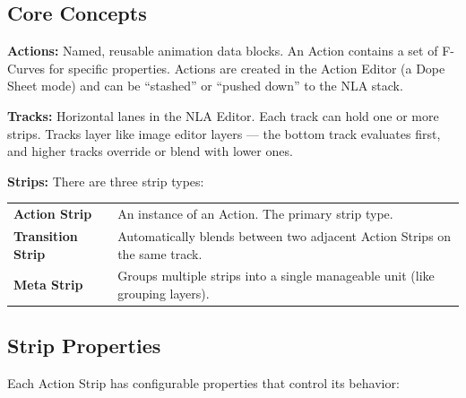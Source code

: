 \subsection{Core Concepts}

\textbf{Actions:} Named, reusable animation data blocks. An Action contains a set of F-Curves for specific properties. Actions are created in the Action Editor (a Dope Sheet mode) and can be ``stashed'' or ``pushed down'' to the NLA stack.

\textbf{Tracks:} Horizontal lanes in the NLA Editor. Each track can hold one or more strips. Tracks layer like image editor layers --- the bottom track evaluates first, and higher tracks override or blend with lower ones.

\textbf{Strips:} There are three strip types:

\begin{center}
\begin{tabularx}{\textwidth}{L{3.5cm}X}
\toprule
{}
 &  \\
\midrule
\textbf{Action Strip} & An instance of an Action. The primary strip type. \\
\textbf{Transition Strip} & Automatically blends between two adjacent Action Strips on the same track. \\
\textbf{Meta Strip} & Groups multiple strips into a single manageable unit (like grouping layers). \\
\bottomrule
\end{tabularx}
\end{center}

\subsection{Strip Properties}

Each Action Strip has configurable properties that control its behavior:

